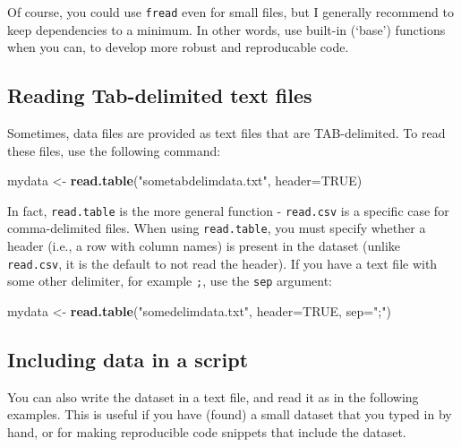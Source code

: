 \documentclass[]{book}
\newenvironment{Shaded}{\begin{snugshade}}{\end{snugshade}}
\newcommand{\DataTypeTok}[1]{\textcolor[rgb]{0.13,0.29,0.53}{#1}}
\newcommand{\KeywordTok}[1]{\textcolor[rgb]{0.13,0.29,0.53}{\textbf{#1}}}
\newcommand{\NormalTok}[1]{#1}
\newcommand{\OtherTok}[1]{\textcolor[rgb]{0.56,0.35,0.01}{#1}}
\newcommand{\StringTok}[1]{\textcolor[rgb]{0.31,0.60,0.02}{#1}}
\begin{document}
Of course, you could use \texttt{fread} even for small files, but I generally recommend to keep dependencies to a minimum. In other words, use built-in (`base') functions when you can, to develop more robust and reproducable code.

\hypertarget{tabdelimtext}{%
\subsection{Reading Tab-delimited text files}\label{tabdelimtext}}

Sometimes, data files are provided as text files that are TAB-delimited. To read these files, use the following command:

\begin{Shaded}
\begin{Highlighting}[]
\NormalTok{mydata <-}\StringTok{ }\KeywordTok{read.table}\NormalTok{(}\StringTok{"sometabdelimdata.txt"}\NormalTok{, }\DataTypeTok{header=}\OtherTok{TRUE}\NormalTok{)}
\end{Highlighting}
\end{Shaded}

In fact, \texttt{read.table} is the more general function - \texttt{read.csv} is a specific case for comma-delimited files. When using \texttt{read.table}, you must specify whether a header (i.e., a row with column names) is present in the dataset (unlike \texttt{read.csv}, it is the default to not read the header). If you have a text file with some other delimiter, for example \texttt{;}, use the \texttt{sep} argument:

\begin{Shaded}
\begin{Highlighting}[]
\NormalTok{mydata <-}\StringTok{ }\KeywordTok{read.table}\NormalTok{(}\StringTok{"somedelimdata.txt"}\NormalTok{, }\DataTypeTok{header=}\OtherTok{TRUE}\NormalTok{, }\DataTypeTok{sep=}\StringTok{";"}\NormalTok{)}
\end{Highlighting}
\end{Shaded}

\hypertarget{datainscript}{%
\subsection{Including data in a script}\label{datainscript}}

You can also write the dataset in a text file, and read it as in the following examples. This is useful if you have (found) a small dataset that you typed in by hand, or for making reproducible code snippets that include the dataset.
\end{document}
